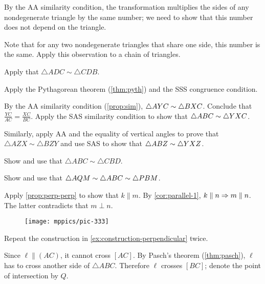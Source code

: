 By the AA similarity condition, the transformation multiplies the sides of any nondegenerate triangle by the same number; we need to show that this number does not depend on the triangle. 

Note that for any two nondegenerate triangles that share one side, this number is the same.
Apply this observation to a chain of triangles.

Apply that $\triangle ADC\sim \triangle CDB$.

Apply the Pythagorean theorem (\ref{thm:pyth}) and the SSS congruence condition.

By the AA similarity condition (\ref{prop:sim}), $\triangle AYC\sim \triangle BXC$.
Conclude that 
$\frac{YC}{AC}=\frac{XC}{BC}$.
Apply the SAS similarity condition to show that $\triangle ABC\sim \triangle YXC$.

Similarly, apply AA and the equality of vertical angles to prove that $\triangle AZX\sim \triangle BZY$ and use SAS to show that $\triangle ABZ\sim \triangle YXZ$.

Show and use that $\triangle ABC\sim \triangle CBD$.

Show and use that $\triangle AQM\sim \triangle ABC\sim\triangle PBM$.


\setcounter{eqtn}{0}


Apply \ref{prop:perp-perp} to show that $k\parallel m$.
By \ref{cor:parallel-1}, $k\parallel n\Rightarrow m\parallel n$.
The latter contradicts that $m\perp n$.


\begin{wrapfigure}[7]{r}{23mm}
\vskip-0mm
\centering
\texttt{[image: mppics/pic-333]}
\end{wrapfigure}

Repeat the construction in \ref{ex:construction-perpendicular} twice.

Since  $\ell\parallel (AC)$, it cannot cross $[AC]$.
By Pasch's theorem (\ref{thm:pasch}), $\ell$ has to cross another side of $\triangle ABC$.
Therefore $\ell$ crosses $[BC]$; denote the point of intersection by $Q$.


